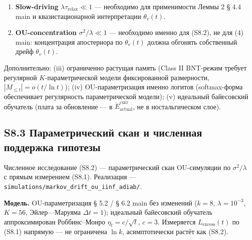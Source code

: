\documentclass[pdflatex,sn-mathphys-ay]{sn-jnl}
\providecommand{\tightlist}{\setlength{\itemsep}{0pt}\setlength{\parskip}{0pt}}
\begin{document}
\begin{enumerate}

\def\labelenumi{\arabic{enumi}.}

\tightlist

\item

  \textbf{Slow-driving} \(\lambda \tau_{\text{relax}} \ll 1\) --- необходимо для применимости Леммы 2 § 4.4 main и квазистационарной интерпретации \(\theta_v(t)\).

\item

  \textbf{OU-concentration} \(\sigma^2/\lambda \ll 1\) --- необходимо именно для (S8.2), не для (4) main: концентрация апостериора по \(\theta_v(t)\) должна обгонять собственный дрейф \(\theta_v(t)\).

\end{enumerate}



Дополнительно: (iii) ограниченно растущая память (Class II BNT-режим требует регулярной \(K\)-параметрической модели фиксированной размерности, \(|M_{\le t}| = o(t/\ln t)\)); (iv) OU-параметризация именно логитов (softmax-форма обеспечивает регулярность параметрической модели); (v) идеальный байесовский обучатель (плата за обновление --- в \(\dot E_{\text{actual}}^{\text{curr}}\), не в ностальгическом слое).



\subsection*{S8.3 Параметрический скан и численная поддержка гипотезы}\label{s8.3-ux43fux430ux440ux430ux43cux435ux442ux440ux438ux447ux435ux441ux43aux438ux439-ux441ux43aux430ux43d-ux438-ux447ux438ux441ux43bux435ux43dux43dux430ux44f-ux43fux43eux434ux434ux435ux440ux436ux43aux430-ux433ux438ux43fux43eux442ux435ux437ux44b}



Численное исследование (S8.2) --- параметрический скан OU-симуляции по \(\sigma^2/\lambda\) с прямым измерением (S8.1). Реализация --- \texttt{simulations/markov\_drift\_ou\_iinf\_adiab/}.



\textbf{Модель.} OU-параметризация § 5.2 / § 6.2 main без изменений (\(k = 8\), \(\lambda = 10^{-3}\), \(K = 56\), Эйлер---Маруяма \(\Delta t = 1\)); идеальный байесовский обучатель аппроксимирован Роббинс--Монро \(\eta_t = c/\sqrt t\), \(c = 3\). Измеряется \(L_{\text{excess}}(t)\) по (S8.1) напрямую --- не ограничена \(\ln k\), асимптотически растёт как (S8.2).
\end{document}
